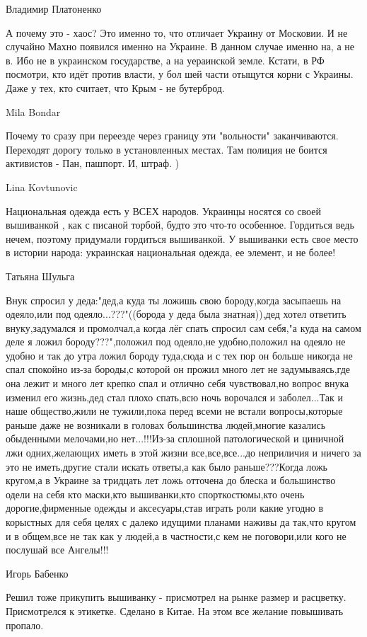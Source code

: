 Владимир Платоненко

А почему это - хаос? Это именно то, что отличает Украину от Московии. И не
случайно Махно появился именно на Украине. В данном случае именно на, а не в.
Ибо не в украинском государстве, а на уераинской земле.  Кстати, в РФ посмотри,
кто идёт против власти, у бол шей части отыщутся корни с Украины. Даже у тех,
кто считает, что Крым - не бутерброд.

Mila Bondar

Почему то сразу при переезде через границу эти "вольности" заканчиваются.
Переходят дорогу только в установленных местах. Там полиция не боится
активистов - Пан, пашпорт. И, штраф. )

Lina Kovtunovic

Национальная одежда есть у ВСЕХ народов. Украинцы носятся со своей вышиванкой ,
как с писаной торбой, будто это что-то особенное. Гордиться ведь нечем, поэтому
придумали гордиться вышиванкой. У вышиванки есть свое место в истории народа:
украинская национальная одежда, ее элемент, и не более!

Татьяна Шульга

Внук спросил у деда:"дед,а куда ты ложишь свою бороду,когда засыпаешь на
одеяло,или под одеяло...???"((борода у деда была знатная)),дед хотел ответить
внуку,задумался и промолчал,а когда лёг спать спросил сам себя,"а куда на самом
деле я ложил бороду???",положил под одеяло,не удобно,положил на одеяло не
удобно и так до утра ложил бороду туда,сюда и с тех пор он больше никогда не
спал спокойно из-за бороды,с которой он прожил много лет не задумываясь,где она
лежит и много лет крепко спал и отлично себя чувствовал,но вопрос внука изменил
его жизнь,дед стал плохо спать,всю ночь ворочался и заболел...Так и наше
общество,жили не тужили,пока перед всеми не встали вопросы,которые раньше даже
не возникали в головах большинства людей,многие казались обыденными мелочами,но
нет...!!!Из-за сплошной патологической и циничной лжи одних,желающих иметь в
этой жизни все,все,все...до неприличия и ничего за это не иметь,другие стали
искать ответы,а как было раньше???Когда ложь кругом,а в Украине за тридцать лет
ложь отточена до блеска и большинство одели на себя кто маски,кто вышиванки,кто
спорткостюмы,кто очень дорогие,фирменные одежды и аксесуары,став играть роли
какие угодно в корыстных для себя целях с далеко идущими планами наживы да
так,что кругом и в общем,все не так как у людей,а в частности,с кем не
поговори,или кого не послушай все Ангелы!!!

Игорь Бабенко

Решил тоже прикупить вышиванку - присмотрел на рынке размер и расцветку. Присмотрелся к этикетке. Сделано в Китае. На этом все желание повышивать пропало.
